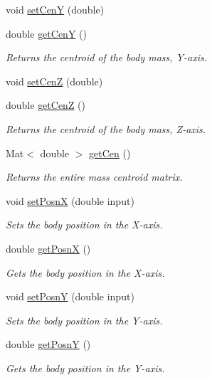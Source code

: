 \begin{DoxyCompactItemize}
void \hyperlink{class_body_abebc4472a354ea0d6307ccaff75714db}{set\-Cen\-Y} (double)
\item 
double \hyperlink{class_body_a5bafecfaa43dd1cf5deef6ada9d03858}{get\-Cen\-Y} ()
\begin{DoxyCompactList}\small\item\em Returns the centroid of the body mass, Y-\/axis. \end{DoxyCompactList}\item 
void \hyperlink{class_body_a866a9f5959854435e8efb688a3d09af7}{set\-Cen\-Z} (double)
\item 
double \hyperlink{class_body_aeab53e414035366be2094485ef72c3b7}{get\-Cen\-Z} ()
\begin{DoxyCompactList}\small\item\em Returns the centroid of the body mass, Z-\/axis. \end{DoxyCompactList}\item 
Mat$<$ double $>$ \hyperlink{class_body_a4e48c171b46972f1348fdf140876210e}{get\-Cen} ()
\begin{DoxyCompactList}\small\item\em Returns the entire mass centroid matrix. \end{DoxyCompactList}\item 
void \hyperlink{class_body_af507be7e52f44404e7664dd623585780}{set\-Posn\-X} (double input)
\begin{DoxyCompactList}\small\item\em Sets the body position in the X-\/axis. \end{DoxyCompactList}\item 
double \hyperlink{class_body_ad649f4405ae4b8e91f69e5e54ff68dcd}{get\-Posn\-X} ()
\begin{DoxyCompactList}\small\item\em Gets the body position in the X-\/axis. \end{DoxyCompactList}\item 
void \hyperlink{class_body_a782d1cf6280cebe6857a1aef764d2572}{set\-Posn\-Y} (double input)
\begin{DoxyCompactList}\small\item\em Sets the body position in the Y-\/axis. \end{DoxyCompactList}\item 
double \hyperlink{class_body_ad4b9a74035b9fcb1af31d2ce300911c4}{get\-Posn\-Y} ()
\begin{DoxyCompactList}\small\item\em Gets the body position in the Y-\/axis. \end{DoxyCompactList}\item 

\end{DoxyCompactItemize}
